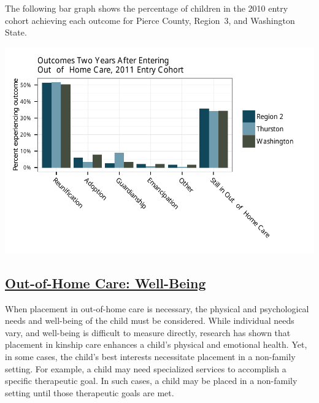 \documentclass{article}\usepackage{graphicx, color}
\makeatletter
\def\maxwidth{ %
  \ifdim\Gin@nat@width>\linewidth
    \linewidth
  \else
    \Gin@nat@width
  \fi
}
\newenvironment{knitrout}{}{} %
\makeatother
\begin{document}
The following bar graph shows the percentage of children in the 2010 entry cohort achieving each outcome for Pierce County, Region~3, and Washington State.
\nopagebreak[3]
\begin{knitrout}
\color{fgcolor}

{\centering \includegraphics[width=\maxwidth]{figure/ooh_outcomes} 

}



\end{knitrout}


\subsection{\href{http://www.partnersforourchildren.org/child-well-being/visualizations/out-home-care/well-being}
    {Out-of-Home Care: Well-Being}
}

When placement in out-of-home care is necessary, the physical and psychological needs and well-being of the child must be considered. While individual needs vary, and well-being is difficult to measure directly, research has shown that placement in kinship care enhances a child's physical and emotional health. Yet, in some cases, the child's best interests necessitate placement in a non-family setting. For example, a child may need specialized services to accomplish a specific therapeutic goal. In such cases, a child may be placed in a non-family setting until those therapeutic goals are met.
\end{document}
